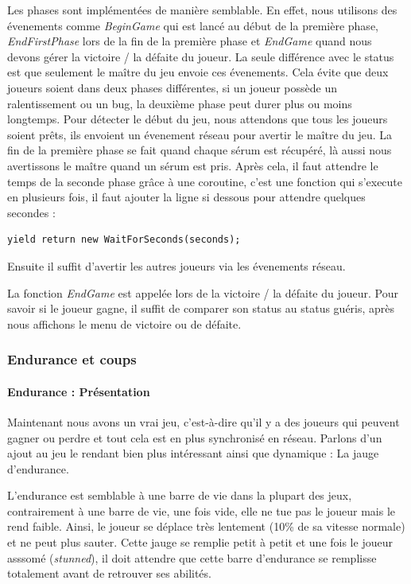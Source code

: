 \documentclass{article}
\begin{document}
Les phases sont implémentées de manière semblable. En effet, nous utilisons des évenements comme \emph{BeginGame} qui est lancé au début de la première phase, \emph{EndFirstPhase} lors de la fin de la première phase et \emph{EndGame} quand nous devons gérer la victoire / la défaite du joueur. La seule différence avec le status est que seulement le maître du jeu envoie ces évenements. Cela évite que deux joueurs soient dans deux phases différentes, si un joueur possède un ralentissement ou un bug, la deuxième phase peut durer plus ou moins longtemps. Pour détecter le début du jeu, nous attendons que tous les joueurs soient prêts, ils envoient un évenement réseau pour avertir le maître du jeu. La fin de la première phase se fait quand chaque sérum est récupéré, là aussi nous avertissons le maître quand un sérum est pris. Après cela, il faut attendre le temps de la seconde phase grâce à une coroutine, c'est une fonction qui s'execute en plusieurs fois, il faut ajouter la ligne si dessous pour attendre quelques secondes :

\begin{lstlisting}
yield return new WaitForSeconds(seconds);
\end{lstlisting}

Ensuite il suffit d'avertir les autres joueurs via les évenements réseau.

La fonction \emph{EndGame} est appelée lors de la victoire / la défaite du joueur. Pour savoir si le joueur gagne, il suffit de comparer son status au status guéris, après nous affichons le menu de victoire ou de défaite.

\newpage
\subsubsection{Endurance et coups}

\paragraph{Endurance : Présentation}

Maintenant nous avons un vrai jeu, c'est-à-dire qu'il y a des joueurs qui peuvent gagner ou perdre et tout cela est en plus synchronisé en réseau. Parlons d'un ajout au jeu le rendant bien plus intéressant ainsi que dynamique : La jauge d'endurance.

L'endurance est semblable à une barre de vie dans la plupart des jeux, contrairement à une barre de vie, une fois vide, elle ne tue pas le joueur mais le rend faible. Ainsi, le joueur se déplace très lentement (10\% de sa vitesse normale) et ne peut plus sauter. Cette jauge se remplie petit à petit et une fois le joueur asssomé (\emph{stunned}), il doit attendre que cette barre d'endurance se remplisse totalement avant de retrouver ses abilités.
\end{document}
